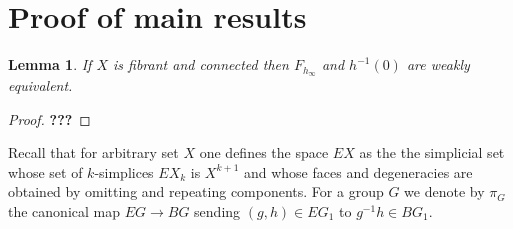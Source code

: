 \documentclass[oneside, 12pt]{amsart}
\theoremstyle{plain}
\numberwithin{equation}{section}
\newtheorem{lemma}{Lemma}
\numberwithin{lemma}{section}
\newtheorem{cor}[lemma]{Corollary}
\theoremstyle{remark}
\theoremstyle{definition}
\newcommand{\catname}[1]{{\normalfont\textbf{#1}}}
\DeclareMathOperator{\HH}{H}
\DeclareMathOperator{\Ker}{Ker}
\newcommand{\ZZ}{\mathbb{Z}}
\begin{document}
\begin{comment}
 To construct the inverse map $\psi\colon H_n(\Lambda^2G) \to HQ_n(G)$ it suffices to check that $c_n(u, u) = 1$.
 But this follows from~\eqref{H00}--\eqref{H0}:
 \[c_n(u, u) = c_n(u, u^{-1}) = h_{nj}(u) \cdot h_{nj}(u^{-1}) \cdot h_{nj}(1)^{-1} = 1. \qedhere\] 
\end{proof}

Thus we obtain the following result.
\begin{cor}
  For $n\geq 3$ the group $Q_n(G)$ is a central extension of $G \wr S_n$ isomorphic to $H_n(\Lambda^2G)\rtimes S_n$.
  The kernel of $\mu$ is isomorphic to $\HH_2(G, \mathbb{Z})$.  
\end{cor}
\end{comment}


\section{Proof of main results} \label{sec:main}
\begin{lemma} \label{lm:weak-equiv}If $X$ is fibrant and connected then $F_{h_\infty}$ and $h^{-1}(0)$ are weakly equivalent. \end{lemma}
\begin{proof}
 {\bf ???}
\end{proof}

\begin{comment}
From the proof of~\cite[Lemma~10.1]{Po17} it follows that the following square of abelian groups is cocartesian in the case $Y$ is fibrant and connected.
\begin{equation} \xymatrix{ \ZZ[\catname{sSets}(X, Y)] \ar[r]  \ar@{->>}_{\alpha}[d] & \catname{sSets}(X, A(Y)) \ar@{->>}_{\beta}[d]  \\
                            \ZZ[\catname{hsSets}(X, Y)] \ar[r] & \catname{hsSets}(X, A(Y))  } 
\label{eq:podkorytov-square} \end{equation}
Here both $\alpha$, $\beta$ map each morphism of simplicial sets to the corresponding class in the homotopy category.
The fact that the above square is cocartesian is equivalent to the surjectivity of the map $\Ker(\alpha)\twoheadrightarrow\Ker(\beta)$.

\begin{equation} \xymatrix{                            & X  \ar[d]^\gamma             &     \\
                            h^{-1}(0)  \ar@{^{(}->}[r] & Y^\infty  \ar[r]^{h_\infty}  & A(Y) } \end{equation}
\end{comment} 
Recall that for arbitrary set $X$ one defines the space $EX$ as the the simplicial set whose set of $k$-simplices $EX_k$
 is $X^{k+1}$ and whose faces and degeneracies are obtained by omitting and repeating components. 
For a group $G$ we denote by $\pi_G$ the canonical map $EG \to BG$ sending $(g, h) \in EG_1$ to $g^{-1}h \in BG_1$.
 
\end{document}
